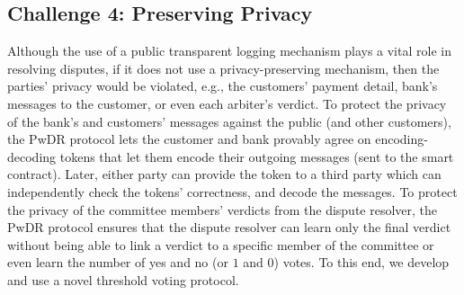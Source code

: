 \subsection{Challenge 4: Preserving Privacy}
 Although the use of a public transparent logging mechanism plays a vital role in resolving disputes, if it does not use a  privacy-preserving mechanism, then the parties' privacy would be violated, e.g., the customers' payment detail,  bank's messages to the customer, or even each arbiter's verdict. To protect the  privacy of the bank's and customers' messages against the public (and other customers), the PwDR protocol lets the customer and bank provably agree on encoding-decoding tokens that let them  encode their outgoing messages (sent to the smart contract). Later, either party can provide the token to a third party which can independently check the tokens' correctness, and decode the messages. To protect the privacy of the committee members' verdicts from the  dispute resolver, the PwDR protocol  ensures that  the dispute resolver can learn only the final verdict without being able to link a verdict to a specific  member of the committee or even learn the number of yes and no (or $1$ and $0$) votes. To this end, we develop and use a novel threshold voting protocol. 
 
 
 
 